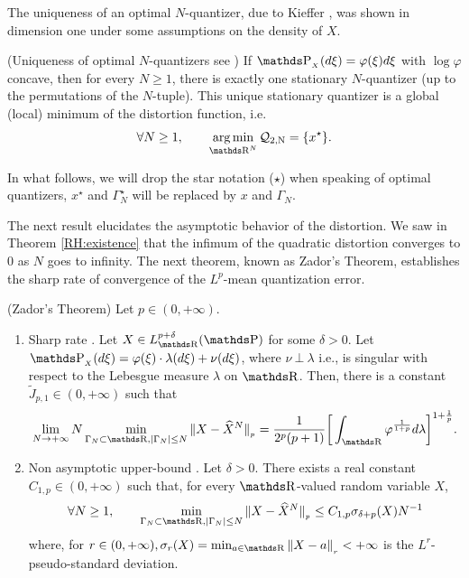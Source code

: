 The uniqueness of an optimal $N$-quantizer, due to Kieffer \cite{kieffer1982exponential}, was shown in dimension one under some assumptions on the density of $X$.
\begin{theorem}{(Uniqueness of optimal $N$-quantizers see \cite{kieffer1982exponential})}\label{RH:uniqueness}
	If $\Prob_{_{X}}(d\xi) = \varphi (\xi) d \xi$ with $\log \varphi$ concave, then for every $N \geq 1$, there is exactly one stationary $N$-quantizer (up to the permutations of the $N$-tuple). This unique stationary quantizer is a global (local) minimum of the distortion function, i.e.
	\begin{equation*}
		\forall N \geq 1, \qquad \argmin_{\R^N} \Distortion = \{ x^{\star} \}.
	\end{equation*}
\end{theorem}
In what follows, we will drop the star notation ($\star$) when speaking of optimal quantizers, $x^{\star}$ and $\Gamma_N^{\star}$ will be replaced by $x$ and $\Gamma_N$.

The next result elucidates the asymptotic behavior of the distortion. We saw in Theorem \ref{RH:existence} that the infimum of the quadratic distortion converges to $0$ as $N$ goes to infinity. The next theorem, known as Zador's Theorem, establishes the sharp rate of convergence of the $L^p$-mean quantization error.

\begin{theorem}{(Zador's Theorem)}\label{RH:zador} Let $p \in (0, + \infty)$.
	\begin{enumerate}[label=(\alph*)]
		\item {\sc Sharp rate \cite{zador1982asymptotic,graf2000foundations}}. Let $X \in L^{p+ \delta}_{\R}(\Prob)$ for some $\delta > 0$. Let $\Prob_{_{X}} (d \xi) = \varphi(\xi) \cdot \lambda ( d \xi ) + \nu ( d \xi ) $, where $\nu ~ \bot ~ \lambda$ i.e., is singular with respect to the Lebesgue measure $\lambda$ on $\R$. Then, there is a constant $\widetilde{J}_{p,1} \in (0, + \infty)$ such that
		      \begin{equation}
			      \lim_{N \rightarrow + \infty} N \min_{\Gamma_N \subset \R, \vert \Gamma_N \vert \leq N } \Vert X - \widehat{X}^N \Vert_{_p} = \frac{1}{2^p (p+1)} \bigg[ \int_{\R} \varphi^{\frac{1}{1+p}} d \lambda \bigg]^{1+\frac{1}{p} }.
		      \end{equation}

		\item {\sc Non asymptotic upper-bound \cite{graf2000foundations,pages2018numerical}}. Let $\delta > 0$. There exists a real constant $C_{1,p} \in (0, +\infty )$ such that, for every $\R$-valued random variable $X$,
		      \begin{equation}
			      \forall N \geq 1, \qquad \min_{\Gamma_N \subset \R, \vert \Gamma_N \vert \leq N } \Vert X - \widehat{X}^N \Vert_{_p} \leq C_{1,p} \sigma_{\delta+p} (X) N^{- 1}
		      \end{equation}
		      where, for $r \in (0, + \infty),\sigma_r(X) = \min_{a \in \R} \left\Vert X - a \right\Vert_{_r} < + \infty$ is the $L^r$-pseudo-standard deviation.
	\end{enumerate}
\end{theorem}

